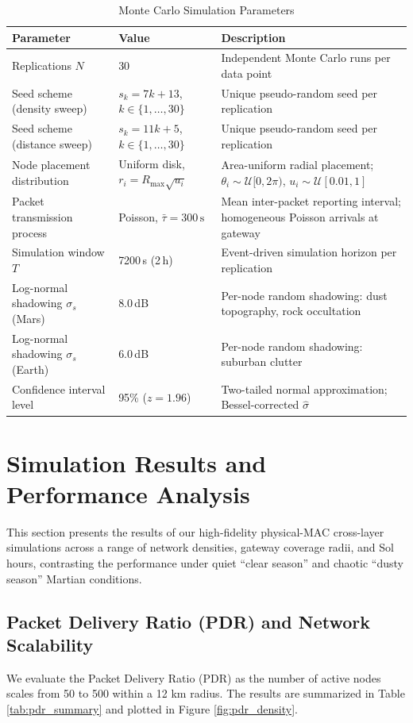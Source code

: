 \documentclass{ijuc}
\begin{document}
\begin{table}
\renewcommand{\arraystretch}{1.3}
\caption{Monte Carlo Simulation Parameters}
\label{tab:mc_params}
\centering
\begin{tabular}{p{3.2cm}|p{2.8cm}|p{4.2cm}}
\hline
\textbf{Parameter} & \textbf{Value} & \textbf{Description} \\
\hline
Replications $N$ & 30 & Independent Monte Carlo runs per data point \\
Seed scheme (density sweep) & $s_k = 7k+13$, $k\in\{1,\ldots,30\}$ & Unique pseudo-random seed per replication \\
Seed scheme (distance sweep) & $s_k = 11k+5$, $k\in\{1,\ldots,30\}$ & Unique pseudo-random seed per replication \\
Node placement distribution & Uniform disk, $r_i = R_{\max}\sqrt{u_i}$ & Area-uniform radial placement; $\theta_i \sim \mathcal{U}[0,2\pi)$, $u_i \sim \mathcal{U}[0.01,1]$ \\
Packet transmission process & Poisson, $\bar{\tau} = 300\,\text{s}$ & Mean inter-packet reporting interval; homogeneous Poisson arrivals at gateway \\
Simulation window $T$ & 7200\,s (2\,h) & Event-driven simulation horizon per replication \\
Log-normal shadowing $\sigma_s$ (Mars) & 8.0\,dB & Per-node random shadowing: dust topography, rock occultation \\
Log-normal shadowing $\sigma_s$ (Earth) & 6.0\,dB & Per-node random shadowing: suburban clutter \\
Confidence interval level & 95\% ($z = 1.96$) & Two-tailed normal approximation; Bessel-corrected $\hat{\sigma}$ \\
\hline
\end{tabular}
\end{table}

\section{Simulation Results and Performance Analysis}
\label{sec:results}
This section presents the results of our high-fidelity physical-MAC cross-layer simulations across a range of network densities, gateway coverage radii, and Sol hours, contrasting the performance under quiet ``clear season'' and chaotic ``dusty season'' Martian conditions.

\subsection{Packet Delivery Ratio (PDR) and Network Scalability}
We evaluate the Packet Delivery Ratio (PDR) as the number of active nodes scales from 50 to 500 within a 12 km radius. The results are summarized in Table \ref{tab:pdr_summary} and plotted in Figure \ref{fig:pdr_density}.
\end{document}
